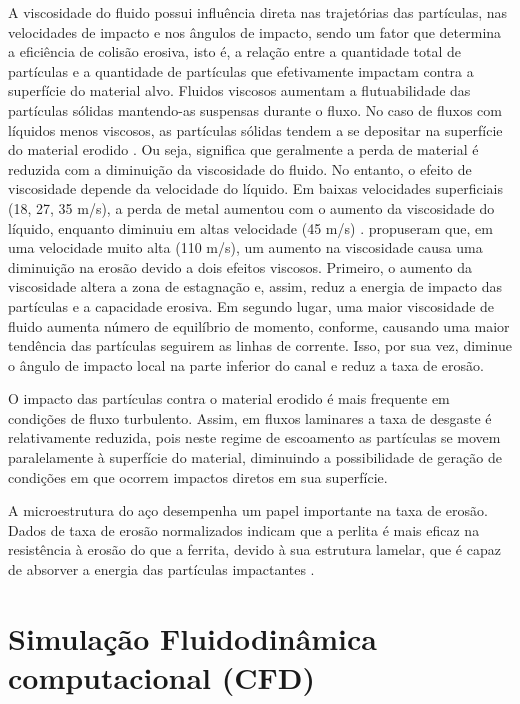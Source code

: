 A viscosidade do fluido possui influência direta nas trajetórias das partículas, nas velocidades de impacto e nos ângulos de impacto, sendo um fator que determina a eficiência de colisão erosiva, isto é, a relação entre a quantidade total de partículas e a quantidade de partículas que efetivamente impactam contra a superfície do material alvo. Fluidos viscosos aumentam a flutuabilidade das partículas sólidas mantendo-as suspensas durante o fluxo. No caso de fluxos com líquidos menos viscosos, as partículas sólidas tendem a se depositar na superfície do material erodido \cite {yabuki}. Ou seja, significa que geralmente a perda de material é reduzida com a diminuição da viscosidade do fluido. No entanto, o efeito de viscosidade depende da velocidade do líquido. Em baixas velocidades superficiais (18, 27, 35 m/s), a perda de metal aumentou com o aumento da viscosidade do líquido, enquanto diminuiu em altas velocidade (45 m/s) \cite {yabuki}.  propuseram que, em uma velocidade muito alta (110 m/s), um aumento na viscosidade causa uma diminuição na erosão devido a dois efeitos viscosos. Primeiro, o aumento da viscosidade altera a zona de estagnação e, assim, reduz a energia de impacto das partículas e a capacidade erosiva. Em segundo lugar, uma maior viscosidade de fluido aumenta número de equilíbrio de momento, conforme, causando uma maior tendência das partículas seguirem as linhas de corrente. Isso, por sua vez, diminue o ângulo de impacto local na parte inferior do canal e reduz a taxa de erosão.

O impacto das partículas contra o material erodido é mais frequente em condições de fluxo turbulento. Assim, em fluxos laminares a taxa de desgaste é relativamente reduzida, pois neste regime de escoamento as partículas se movem paralelamente à superfície do material, diminuindo a possibilidade de geração de condições em que ocorrem impactos diretos em sua superfície.

A microestrutura do aço desempenha um papel importante na taxa de erosão. Dados de taxa de erosão normalizados indicam que a perlita é mais eficaz na resistência à erosão do que a ferrita, devido à sua estrutura lamelar, que é capaz de absorver a energia das partículas impactantes \cite{yabuki}.





\section{Simulação Fluidodinâmica computacional (CFD)}
\label{Simulação Fluidodinâmica computacional (CFD)}

